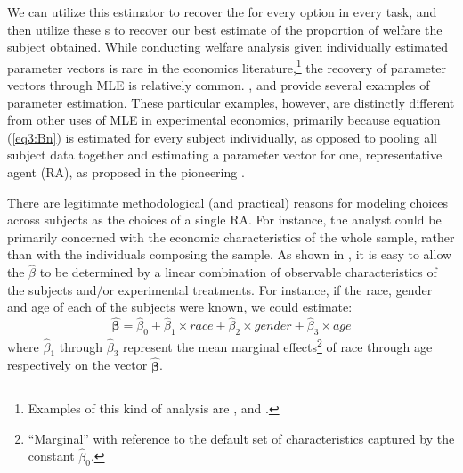\documentclass[../main.tex]{subfiles}
\begin{document}
We can utilize this estimator to recover the {\CE} for every option in every task, and then utilize these \CE s to recover our best estimate of the proportion of welfare the subject obtained.
While conducting welfare analysis given individually estimated parameter vectors is rare in the economics literature,\footnote{
	Examples of this kind of analysis are \textcite{Harrison2016}, \textcite{Harrison2017} and \textcite{Harrison2017a}.
} the recovery of parameter vectors through MLE is relatively common.
\textcite{Hey1994}, \textcite{Wilcox2015} and \textcite{Hey2001} provide several examples of parameter estimation.
These particular examples, however, are distinctly different from other uses of MLE in experimental economics, primarily because equation (\ref{eq3:Bn}) is estimated for every subject individually, as opposed to pooling all subject data together and estimating a parameter vector for one, representative agent (RA), as proposed in the pioneering \textcite{Camerer1994}.


There are legitimate methodological (and practical) reasons for modeling choices across subjects as the choices of a single RA.
For instance, the analyst could be primarily concerned with the economic characteristics of the whole sample, rather than with the individuals composing the sample.
As shown in \textcite[63]{Harrison2008}, it is easy to allow the $\hat{\beta}$ to be determined by a linear combination of observable characteristics of the subjects and/or experimental treatments.
For instance, if the race, gender and age of each of the subjects were known, we could estimate:
\begin{equation}
	\label{eq3:BB}
	\bm{\hat{\beta}} = \hat{\beta}_0 + \hat{\beta}_1 \times \mathit{race} + \hat{\beta}_2 \times \mathit{gender} + \hat{\beta}_3 \times \mathit{age}
\end{equation}
\noindent where $\hat{\beta}_1$ through $\hat{\beta}_3$ represent the mean marginal effects\footnote{
	\enquote{Marginal} with reference to the default set of characteristics captured by the constant $\hat{\beta}_0$.
} of race through age respectively on the vector $\bm{\hat{\beta}}$.

\end{document}
